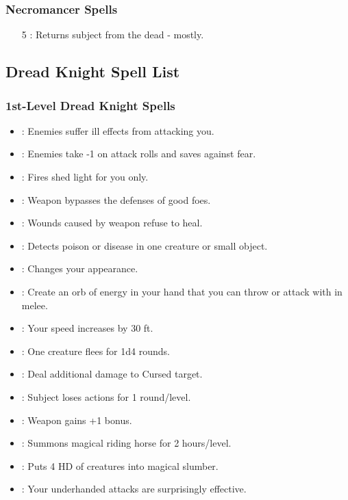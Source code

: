 \subsubsection{Necromancer Spells}
\begin{itemize}
 \item[5] : Returns subject from the dead - mostly.
\end{itemize}

\subsection{Dread Knight Spell List}
\subsubsection{1st-Level Dread Knight Spells}
\begin{itemize}
\item {}: Enemies suffer ill effects from attacking you.
\item {}: Enemies take -1 on attack rolls and saves against fear.
\item {}: Fires shed light for you only.
\item {}: Weapon bypasses the defenses of good foes.
\item {}: Wounds caused by weapon refuse to heal.
\item {}: Detects poison or disease in one creature or small object.
\item {}: Changes your appearance.
\item {}: Create an orb of energy in your hand that you can throw or attack with in melee.
\item {}: Your speed increases by 30 ft.
\item {}: One creature flees for 1d4 rounds.
\item {}: Deal additional damage to Cursed target.
\item {}: Subject loses actions for 1 round/level.
\item {}: Weapon gains +1 bonus.
\item {}: Summons magical riding horse for 2 hours/level.
\item {}: Puts 4 HD of creatures into magical slumber.
\item {}: Your underhanded attacks are surprisingly effective.
\end{itemize}
